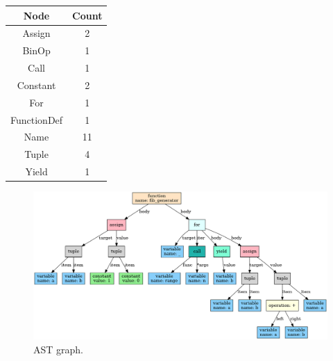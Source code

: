 \documentclass{article}
\begin{document}
\begin{center}
\begin{tabular}{ | c | c | }
\hline
Node & Count \\ \hline
Assign & 2 \\ \hline
BinOp & 1 \\ \hline
Call & 1 \\ \hline
Constant & 2 \\ \hline
For & 1 \\ \hline
FunctionDef & 1 \\ \hline
Name & 11 \\ \hline
Tuple & 4 \\ \hline
Yield & 1 \\ \hline
\end{tabular}
\begin{figure}
\includegraphics[width=\linewidth]{fixtures/image.png}
\caption{AST graph.}
\label{fig:graph}
\end{figure}
\end{center}
\end{document}
